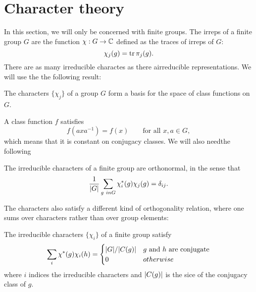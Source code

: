 \section{Character theory}
\label{sec:character_theory}

In this section, we will only be concerned with finite groups.
The irreps of a finite group $G$ are the function $\chi : G \to \mathbb{C}$ defined as the traces of irreps of $G$:
\begin{equation}
    \chi_j(g) = \tr \pi_j (g).
\end{equation}
There are as many irreducible charactes as there airreducible representations.
We will use the the following result:

\begin{theorem}
    The characters $\{\chi_j\} $ of a group $G$ form a basis for the space of class functions on $G$.
\end{theorem}

A class function $f$ satisfies
\begin{equation}
    f(a x a^{-1}) = f(x)
    \qquad \text{for all $x, a \in G$},
\end{equation}
which means that it is constant on conjugacy classes.
We will also needthe following

\begin{theorem}
    The irreducible characters of a finite group are orthonormal, in the sense that
    \begin{equation}
        \frac{1}{\abs{G}} \sum_{g \ in G} \chi_i^{\ast}(g) \chi_j(g) = \delta_{ij}.
    \end{equation}
\end{theorem}

The characters also satisfy a different kind of orthogonality relation, where one sums over characters rather than over group elements:

\begin{theorem}
    The irreducible characters $\{\chi_i\}$ of a finite group satisfy
    \begin{equation}
        \sum_{i} \chi^{\ast}(g) \chi_i(h) =
        \begin{cases}
            \abs{G} / \abs{C(g)} & \text{$g$ and $h$ are conjugate} \\
            0 & otherwise
        \end{cases}
    \end{equation}
    where $i$ indices the irreducible characters and $\abs{C(g)}$ is the sice of the conjugacy class of $g$.
\end{theorem}

